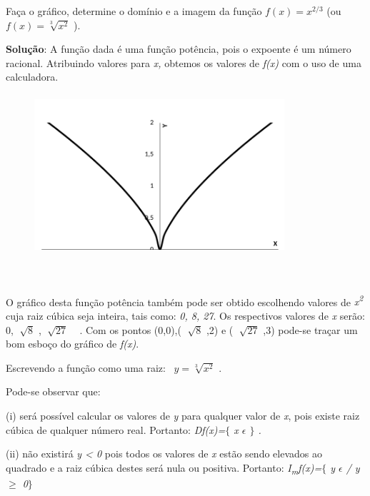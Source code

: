 \begin{texemplo}

Faça o gráfico, determine o domínio e a imagem da função  \( f \left( x \right) =x^{2/3} \)  (ou  \( f \left( x \right) =\sqrt[3]{x^{2}} \) ).

\textbf{Solução}: A função dada é uma função potência, pois o expoente é um número racional. Atribuindo valores para \textit{x,} obtemos os valores de \textit{f(x)} com o uso de uma calculadora. 

\begin{figure}[H]
\begin{Center}
        \includegraphics[width=3.65in,height=2.35in]{capitulos/outras_funcoes/media/image2.pdf}
    \end{Center}
\end{figure}
~~

\quad O gráfico desta função potência também pode ser obtido escolhendo valores de \textit{x\textsuperscript{2}} cuja raiz cúbica seja inteira, tais como: \textit{0, 8, 27}. Os respectivos valores de \textit{x} serão: 0,  \( \sqrt[]{8} \) ,  \( \sqrt[]{27} \) ~ . Com os pontos (0,0),( \( \sqrt[]{8} \) ,2) e ( \( \sqrt[]{27} \) ,3) pode-se traçar um bom esboço do gráfico de \textit{f(x)}.

\quad Escrevendo a função como uma raiz:~  \( y=\sqrt[3]{x^{2}} \) .

Pode-se observar que: 

(i) será possível calcular os valores de \textit{y} para qualquer valor de \textit{x}, pois existe raiz cúbica de qualquer número real. Portanto: \textit{Df(x)=$ \{ $  x $ \epsilon $  $ \} $ .}

(ii) não existirá \textit{y < 0} pois todos os valores de \textit{x} estão sendo elevados ao quadrado e a raiz cúbica destes será nula ou positiva. Portanto: \textit{I\textsubscript{m}f(x)=$ \{ $ y $ \epsilon $   / y $ \geq $  0$ \} $ }\qedsymbol{}
\end{texemplo}
 
